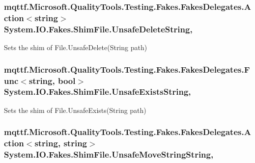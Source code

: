 \hypertarget{class_system_1_1_i_o_1_1_fakes_1_1_shim_file_ac258c5ff8962752418d900d12f905ab1}{
\subsubsection[{Unsafe\-Delete\-String}]{\setlength{\rightskip}{0pt plus 5cm}mqttf.\-Microsoft.\-Quality\-Tools.\-Testing.\-Fakes.\-Fakes\-Delegates.\-Action$<$string$>$ System.\-I\-O.\-Fakes.\-Shim\-File.\-Unsafe\-Delete\-String\hspace{0.3cm}{\ttfamily [static]}, {\ttfamily [set]}}}\label{class_system_1_1_i_o_1_1_fakes_1_1_shim_file_ac258c5ff8962752418d900d12f905ab1}


Sets the shim of File.\-Unsafe\-Delete(\-String path)

\hypertarget{class_system_1_1_i_o_1_1_fakes_1_1_shim_file_a8c1dafef3fe1be775d62fbac4632b5ac}{
\subsubsection[{Unsafe\-Exists\-String}]{\setlength{\rightskip}{0pt plus 5cm}mqttf.\-Microsoft.\-Quality\-Tools.\-Testing.\-Fakes.\-Fakes\-Delegates.\-Func$<$string, bool$>$ System.\-I\-O.\-Fakes.\-Shim\-File.\-Unsafe\-Exists\-String\hspace{0.3cm}{\ttfamily [static]}, {\ttfamily [set]}}}\label{class_system_1_1_i_o_1_1_fakes_1_1_shim_file_a8c1dafef3fe1be775d62fbac4632b5ac}


Sets the shim of File.\-Unsafe\-Exists(\-String path)

\hypertarget{class_system_1_1_i_o_1_1_fakes_1_1_shim_file_a541634a1c748de85b427b1e9b7fece72}{
\subsubsection[{Unsafe\-Move\-String\-String}]{\setlength{\rightskip}{0pt plus 5cm}mqttf.\-Microsoft.\-Quality\-Tools.\-Testing.\-Fakes.\-Fakes\-Delegates.\-Action$<$string, string$>$ System.\-I\-O.\-Fakes.\-Shim\-File.\-Unsafe\-Move\-String\-String\hspace{0.3cm}{\ttfamily [static]}, {\ttfamily [set]}}}\label{class_system_1_1_i_o_1_1_fakes_1_1_shim_file_a541634a1c748de85b427b1e9b7fece72}


